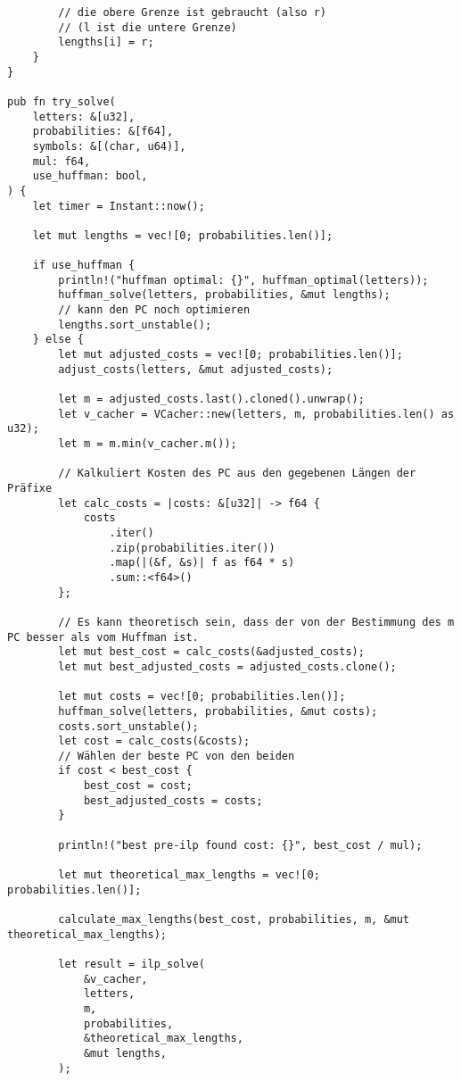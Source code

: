 \begin{lstlisting}
        // die obere Grenze ist gebraucht (also r)
        // (l ist die untere Grenze)
        lengths[i] = r;
    }
}

pub fn try_solve(
    letters: &[u32],
    probabilities: &[f64],
    symbols: &[(char, u64)],
    mul: f64,
    use_huffman: bool,
) {
    let timer = Instant::now();

    let mut lengths = vec![0; probabilities.len()];

    if use_huffman {
        println!("huffman optimal: {}", huffman_optimal(letters));
        huffman_solve(letters, probabilities, &mut lengths);
        // kann den PC noch optimieren
        lengths.sort_unstable();
    } else {
        let mut adjusted_costs = vec![0; probabilities.len()];
        adjust_costs(letters, &mut adjusted_costs);

        let m = adjusted_costs.last().cloned().unwrap();
        let v_cacher = VCacher::new(letters, m, probabilities.len() as u32);
        let m = m.min(v_cacher.m());

        // Kalkuliert Kosten des PC aus den gegebenen Längen der Präfixe
        let calc_costs = |costs: &[u32]| -> f64 {
            costs
                .iter()
                .zip(probabilities.iter())
                .map(|(&f, &s)| f as f64 * s)
                .sum::<f64>()
        };

        // Es kann theoretisch sein, dass der von der Bestimmung des m PC besser als vom Huffman ist.
        let mut best_cost = calc_costs(&adjusted_costs);
        let mut best_adjusted_costs = adjusted_costs.clone();

        let mut costs = vec![0; probabilities.len()];
        huffman_solve(letters, probabilities, &mut costs);
        costs.sort_unstable();
        let cost = calc_costs(&costs);
        // Wählen der beste PC von den beiden
        if cost < best_cost {
            best_cost = cost;
            best_adjusted_costs = costs;
        }

        println!("best pre-ilp found cost: {}", best_cost / mul);

        let mut theoretical_max_lengths = vec![0; probabilities.len()];

        calculate_max_lengths(best_cost, probabilities, m, &mut theoretical_max_lengths);

        let result = ilp_solve(
            &v_cacher,
            letters,
            m,
            probabilities,
            &theoretical_max_lengths,
            &mut lengths,
        );


\end{lstlisting}
